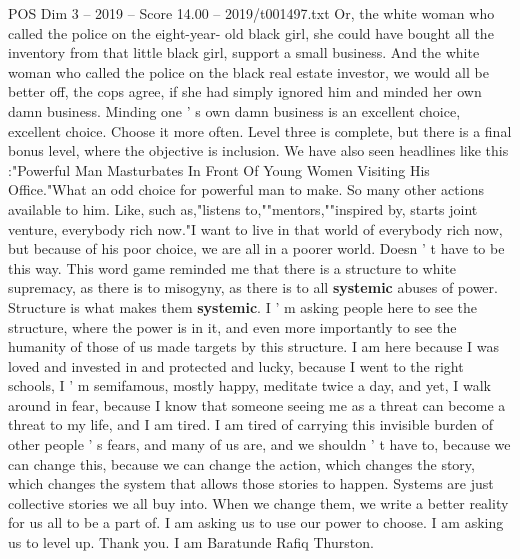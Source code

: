 \begin{textsample}{POS Dim 3 – 2019 – Score 14.00 – 2019/t001497.txt}
Or, the white woman who called the police on the eight-year- old black girl, she could have bought all the inventory from that little black girl, support a small business.
And the white woman who called the police on the black real estate investor, we would all be better off, the cops agree, if she had simply ignored him and minded her own damn business.
Minding one ' s own damn business is an excellent choice, excellent choice.
Choose it more often.
Level three is complete, but there is a final bonus level, where the objective is inclusion.
We have also seen headlines like this :"Powerful Man Masturbates In Front Of Young Women Visiting His Office."What an odd choice for powerful man to make.
So many other actions available to him.
Like, such as,"listens to,""mentors,""inspired by, starts joint venture, everybody rich now."I want to live in that world of everybody rich now, but because of his poor choice, we are all in a poorer world.
Doesn ' t have to be this way.
This word game reminded me that there is a structure to white supremacy, as there is to misogyny, as there is to all \textbf{systemic} abuses of power.
Structure is what makes them \textbf{systemic}.
I ' m asking people here to see the structure, where the power is in it, and even more importantly to see the humanity of those of us made targets by this structure.
I am here because I was loved and invested in and protected and lucky, because I went to the right schools, I ' m semifamous, mostly happy, meditate twice a day, and yet, I walk around in fear, because I know that someone seeing me as a threat can become a threat to my life, and I am tired.
I am tired of carrying this invisible burden of other people ' s fears, and many of us are, and we shouldn ' t have to, because we can change this, because we can change the action, which changes the story, which changes the system that allows those stories to happen.
Systems are just collective stories we all buy into.
When we change them, we write a better reality for us all to be a part of.
I am asking us to use our power to choose.
I am asking us to level up.
Thank you.
I am Baratunde Rafiq Thurston.

\end{textsample}
